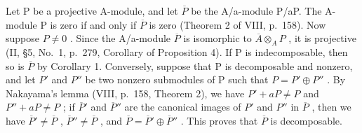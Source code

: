 Let P be a projective A-module, and let \(\overline{P}\) be the A/a-module P/aP. The A-module P is zero if and only if \(\overline{P}\) is zero (Theorem 2 of VIII, p.~158). Now suppose \(P \neq 0\) . Since the A/a-module \(\overline{P}\) is isomorphic to \(\overline{A} \otimes_{A} P\) , it is projective (II, §5, No.~1, p.~279, Corollary of Proposition 4). If P is indecomposable, then so is \(\overline{P}\) by Corollary 1. Conversely, suppose that P is decomposable and nonzero, and let \(P'\) and \(P''\) be two nonzero submodules of P such that \(P = P' \oplus P''\) . By Nakayama's lemma (VIII, p.~158, Theorem 2), we have \(P' + aP \neq P\) and \(P'' + aP \neq P\) ; if \(\overline{P}'\) and \(\overline{P}''\) are the canonical images of \(P'\) and \(P''\) in \(\overline{P}\) , then we have \(\overline{P}' \neq \overline{P}\) , \(\overline{P}'' \neq \overline{P}\) , and \(\overline{P} = \overline{P}' \oplus \overline{P}''\) . This proves that \(\overline{P}\) is decomposable.
\relax{}
